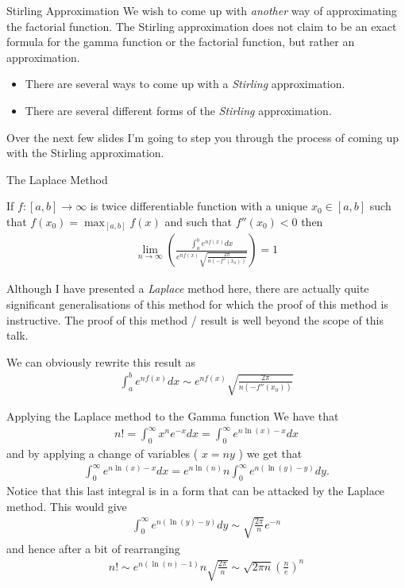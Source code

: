\documentclass[pdf]{beamer}
\newcommand{\lra}{\longrightarrow}
\begin{document}
\begin{frame}{Stirling Approximation}
We wish to come up with \emph{another} way of approximating the factorial function.
The Stirling approximation does not claim to be an exact formula for the gamma function or the factorial function, but rather
an approximation.
\begin{itemize}
    \item There are several ways to come up with a \emph{Stirling} approximation.
    \item There are several different forms of the \emph{Stirling} approximation.
\end{itemize}
Over the next few slides I'm going to step you through the process of coming up with the Stirling approximation.
\end{frame}
\begin{frame}{The Laplace Method}
\begin{theorem}
        If $ f : [a, b] \lra \infty $ is twice differentiable function with a unique $ x_0 \in [a,b] $ such that $ f(x_0) = \max_{[a,b]}f(x) $ and such that $ f''(x_0) < 0 $ then
\begin{align*}
    \lim_{n \lra \infty} \left( \frac{\int_a^b e^{nf(x)}dx}{e^{nf(x)} \sqrt{\frac{2\pi}{n(-f''(x_0))}}} \right) = 1
\end{align*}
\end{theorem}

Although I have presented a \emph{Laplace} method here, there are actually quite significant generalisations of this method for which the proof of this method is instructive. The proof of this method / result is well beyond the scope of this talk. 

We can obviously rewrite this result as
\begin{align*}
    \int_a^b e^{nf(x)}dx \sim e^{nf(x)} \sqrt{\frac{2\pi}{n(-f''(x_0))}}
\end{align*}
\end{frame}

\begin{frame}{Applying the Laplace method to the Gamma function}
We have that
\begin{align*}
    n! = \int_0^\infty x^n e^{-x} dx = \int_0^\infty e^{n\ln(x) - x} dx
\end{align*}
and by applying a change of variables ( $ x = ny $ ) we get that
\begin{align*}
    \int_0^\infty e^{n\ln(x) - x} dx = e^{n\ln(n)}n \int_0^\infty e^{n(\ln(y) - y)} dy.
\end{align*}
Notice that this last integral is in a form that can be attacked by the Laplace method. This would give
\begin{align*}
    \int_0^\infty e^{n(\ln(y) -y)} dy \sim \sqrt{\frac{2\pi}{n}}e^{-n}
\end{align*}
and hence after a bit of rearranging
\begin{align*}
    n! \sim e^{n(\ln(n) - 1)}n \sqrt{\frac{2\pi}{n}} \sim \sqrt{2\pi n} \left( \frac{n}{e}\right)^n
\end{align*}
    
\end{frame}
\end{document}
